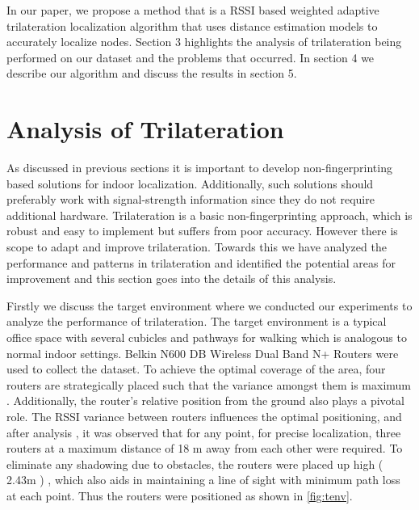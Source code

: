 \documentclass[twocolumn, 11pt]{IEEEtran}
\begin{document}
In our paper, we propose a method that is a RSSI based weighted adaptive trilateration localization algorithm that uses distance estimation models to accurately localize nodes. Section 3 highlights the analysis of trilateration being performed on our dataset and the problems that occurred. In section 4 we describe our algorithm and discuss the results in section 5. 

    

\section{Analysis of Trilateration}


As discussed in previous sections it is important to develop non-fingerprinting based solutions for indoor localization. Additionally, such solutions should preferably work with signal-strength information since they do not require additional hardware. Trilateration is a basic non-fingerprinting approach, which is robust and easy to implement but suffers from poor accuracy. However there is scope to adapt and improve trilateration. Towards this we have analyzed the performance and patterns in trilateration and identified the potential areas for improvement and this section goes into the details of this analysis. 

Firstly we discuss the target environment where we conducted our experiments to analyze the performance of trilateration. The target environment is a typical office space with several cubicles and pathways for walking which is analogous to normal indoor settings.   Belkin N600 DB Wireless Dual Band N+ Routers were used to collect the dataset. To achieve the optimal coverage of the area, four routers are strategically placed such that the variance amongst them is maximum \cite{kaemarungsi2012analysis , CiscoLocation}. Additionally, the router's relative position from the ground also plays a pivotal role. The RSSI variance between routers influences the optimal positioning, and after analysis \cite{shanmugaapriyan2014pragmatic} , it was observed that for any point, for precise localization, three routers at a maximum distance of 18 m away from each other were required. To eliminate any shadowing due to obstacles, the routers were placed up high ( 2.43m ) \cite{shanmugaapriyan2014pragmatic}, which also aids in maintaining a line of sight with minimum path loss at each point. Thus the routers were positioned as shown in \ref{fig:tenv}. 
\end{document}
